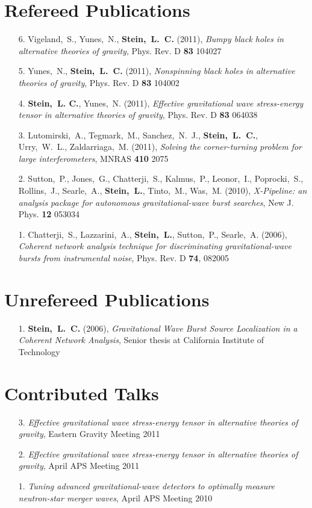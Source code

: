 \documentclass[margin,line]{res}
\begin{document}
\begin{resume}
\section{\sc Refereed Publications}
\begin{enumerate}
\item[{6.}] Vigeland,~S., Yunes,~N., {\bf Stein,~L.~C.} (2011), {\it
    Bumpy black holes in alternative theories of gravity},
  Phys. Rev. D {\bf 83} 104027
\item[{5.}] Yunes,~N., {\bf Stein,~L.~C.} (2011), {\it Nonspinning
    black holes in alternative theories of gravity},
  Phys. Rev. D {\bf 83} 104002
\item[{4.}] {\bf Stein,~L. C.}, Yunes,~N. (2011), {\it Effective
    gravitational wave stress-energy tensor in alternative theories of
    gravity}, Phys. Rev. D {\bf 83} 064038
\item[{3.}] Lutomirski,~A., Tegmark,~M., Sanchez,~N.~J., {\bf
    Stein,~L.~C.},
  Urry,~W.~L., Zaldarriaga,~M. (2011), {\it Solving the
    corner-turning problem for large interferometers}, MNRAS {\bf 410} 2075
\item[{2.}] Sutton,~P., Jones,~G., Chatterji,~S., Kalmus,~P., Leonor,~I.,
  Poprocki,~S., Rollins,~J., Searle,~A., {\bf Stein,~L.}, Tinto,~M.,
  Was,~M. (2010), {\it X-Pipeline: an analysis package for autonomous
    gravitational-wave burst searches}, New J. Phys. {\bf 12} 053034
\item[{1.}] Chatterji,~S., Lazzarini,~A., {\bf Stein,~L.}, Sutton,~P.,
  Searle,~A. (2006), {\it Coherent network analysis technique for
    discriminating gravitational-wave bursts from instrumental noise},
  Phys. Rev. D {\bf 74}, 082005
\end{enumerate}

\section{\sc Unrefereed Publications}
\begin{enumerate}
\item[{1.}] {\bf Stein,~L.~C.} (2006), {\it Gravitational Wave Burst Source Localization in a Coherent Network Analysis}, Senior thesis at California Institute of Technology
\end{enumerate}

\section{\sc Contributed Talks}
\begin{enumerate}
\item[{3.}] {\it Effective gravitational wave stress-energy tensor in
    alternative theories of gravity}, Eastern Gravity Meeting 2011
\item[{2.}] {\it Effective gravitational wave stress-energy tensor in alternative theories of gravity}, April APS Meeting 2011
\item[{1.}] {\it Tuning advanced gravitational-wave detectors to
    optimally measure neutron-star merger waves}, April APS Meeting 2010
\end{enumerate}


\end{resume}
\end{document}
